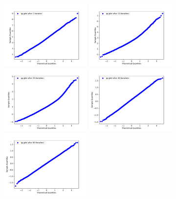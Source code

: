 \documentclass{scrartcl}
\begin{document}
		\begin{figure}[H]
			\centering
			\includegraphics[width=0.4\textwidth]{../imgs/harmonic_oscillator_track/track_10010000_qq_1.pdf}
			\includegraphics[width=0.4\textwidth]{../imgs/harmonic_oscillator_track/track_10010000_qq_10.pdf}
			\\
			\includegraphics[width=0.4\textwidth]{../imgs/harmonic_oscillator_track/track_10010000_qq_20.pdf}
			\includegraphics[width=0.4\textwidth]{../imgs/harmonic_oscillator_track/track_10010000_qq_40.pdf}
			\\
			\includegraphics[width=0.4\textwidth]{../imgs/harmonic_oscillator_track/track_10010000_qq_80.pdf}

\end{figure}
\end{document}
